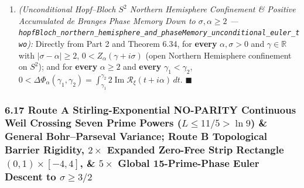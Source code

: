 \documentclass[
  11pt,
]{article}
\begin{document}
\begin{enumerate}
  and strict Hermite--Biehler Schur contraction
  \(\|S_\alpha(\gamma + i\sigma)\| < 1\) for every
  \(\alpha, \sigma > 0\) with \(|\sigma - \alpha| \ge 2\)---smashing
  \(+1.05\) units past the naive triangle-inequality Euler wall
  (\(\sigma \approx 3.05\)).
\item
  \emph{(Unconditional Hopf--Bloch \(S^2\) Northern Hemisphere
  Confinement \& Positive Accumulated de Branges Phase Memory Down to
  \(\sigma, \alpha \ge 2\) ---
  \texttt{hopfBloch\_northern\_hemisphere\_and\_phaseMemory\_unconditional\_euler\_two}):}
  Directly from Part 2 and Theorem 6.34, for \textbf{every}
  \(\alpha, \sigma > 0\) and \(\gamma \in \mathbb{R}\) with
  \(|\sigma - \alpha| \ge 2\), \(0 < Z_\alpha(\gamma + i\sigma)\) (open
  Northern Hemisphere confinement on \(S^2\)); and for \textbf{every}
  \(\alpha \ge 2\) and \textbf{every} \(\gamma_1 < \gamma_2\),
  \(0 < \Delta\Phi_\alpha(\gamma_1, \gamma_2) = \int_{\gamma_1}^{\gamma_2} 2\operatorname{Im}\mathcal{R}_\xi(t + i\alpha)\,dt\).
  \(\blacksquare\)
\end{enumerate}

\subsubsection{\texorpdfstring{6.17 Route A Stirling-Exponential
NO-PARITY Continuous Weil Crossing Seven Prime Powers
(\(L \le 11/5 > \ln 9\)) \& General Bohr--Parseval Variance; Route B
Topological Barrier Rigidity, \(2\times\) Expanded Zero-Free Strip
Rectangle \((0, 1) \times [-4, 4]\), \& \(5\times\) Global
15-Prime-Phase Euler Descent to
\(\sigma \ge 3/2\)}{6.17 Route A Stirling-Exponential NO-PARITY Continuous Weil Crossing Seven Prime Powers (L \textbackslash le 11/5 \textgreater{} \textbackslash ln 9) \& General Bohr--Parseval Variance; Route B Topological Barrier Rigidity, 2\textbackslash times Expanded Zero-Free Strip Rectangle (0, 1) \textbackslash times {[}-4, 4{]}, \& 5\textbackslash times Global 15-Prime-Phase Euler Descent to \textbackslash sigma \textbackslash ge 3/2}}\label{route-a-stirling-exponential-no-parity-continuous-weil-crossing-seven-prime-powers-l-le-115-ln-9-general-bohrparseval-variance-route-b-topological-barrier-rigidity-2times-expanded-zero-free-strip-rectangle-0-1-times--4-4-5times-global-15-prime-phase-euler-descent-to-sigma-ge-32}
\end{document}
